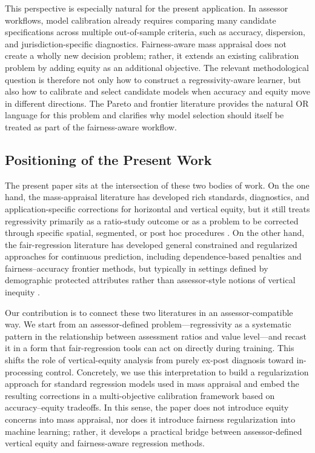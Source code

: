 \documentclass[12pt, draft]{article}
\theoremstyle{plain}
\theoremstyle{definition}
\newcommand{\1}{\mathbf{1}}
\begin{document}
This perspective is especially natural for the present application. In assessor workflows, model calibration already requires comparing many candidate specifications across multiple out-of-sample criteria, such as accuracy, dispersion, and jurisdiction-specific diagnostics. Fairness-aware mass appraisal does not create a wholly new decision problem; rather, it extends an existing calibration problem by adding equity as an additional objective. The relevant methodological question is therefore not only how to construct a regressivity-aware learner, but also how to calibrate and select candidate models when accuracy and equity move in different directions. The Pareto and frontier literature provides the natural OR language for this problem and clarifies why model selection should itself be treated as part of the fairness-aware workflow.

\subsection{Positioning of the Present Work}

The present paper sits at the intersection of these two bodies of work. On the one hand, the mass-appraisal literature has developed rich standards, diagnostics, and application-specific corrections for horizontal and vertical equity, but it still treats regressivity primarily as a ratio-study outcome or as a problem to be corrected through specific spatial, segmented, or post hoc procedures \cite{Quintos2014,IAAO2023VerticalReview,BidansetEtAl2019,CandoganHanLu2023}. On the other hand, the fair-regression literature has developed general constrained and regularized approaches for continuous prediction, including dependence-based penalties and fairness--accuracy frontier methods, but typically in settings defined by demographic protected attributes rather than assessor-style notions of vertical inequity \cite{AgarwalDudikWu2019,LiEtAl2022Fairness,lee2022maximal,martinez2020minimax,little2022fairness}.

Our contribution is to connect these two literatures in an assessor-compatible way. We start from an assessor-defined problem---regressivity as a systematic pattern in the relationship between assessment ratios and value level---and recast it in a form that fair-regression tools can act on directly during training. This shifts the role of vertical-equity analysis from purely ex-post diagnosis toward in-processing control. Concretely, we use this interpretation to build a regularization approach for standard regression models used in mass appraisal and embed the resulting corrections in a multi-objective calibration framework based on accuracy--equity tradeoffs. In this sense, the paper does not introduce equity concerns into mass appraisal, nor does it introduce fairness regularization into machine learning; rather, it develops a practical bridge between assessor-defined vertical equity and fairness-aware regression methods.
\end{document}

